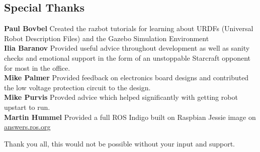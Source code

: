 \documentclass[12pt,titlepage,oneside]{memoir}
\begin{document}
\begin{appendices}
\chapter{Special Thanks}
\textbf{Paul Bovbel} Created the razbot tutorials for learning about URDFs (Universal Robot Description Files) and the Gazebo Simulation Environment\\
\textbf{Ilia Baranov} Provided useful advice throughout development as well as sanity checks and emotional support in the form of an unstoppable Starcraft opponent for most in the office. \\
\textbf{Mike Palmer} Provided feedback on electronics board designs and contributed the low voltage protection circuit to the design.\\
\textbf{Mike Purvis} Provded advice which helped significantly with getting robot upstart to run.\\
\textbf{Martin Hummel} Provided a full ROS Indigo built on Raspbian Jessie image on \href{http://answers.ros.org/question/200504/raspbian-jessie-ros-indigo-download-image/?comment=203168#comment-203168}{answers.ros.org}

Thank you all, this would not be possible without your input and support.

\end{appendices}
\end{document}
